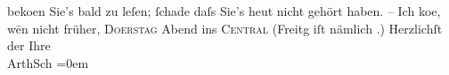 \begin{ledgroupsized}[t]{13cm}
                  beko{\geminationm}en Sie’s bald zu leſen; ſchade daſs Sie’s heut
               nicht gehört haben. – Ich ko{\geminationm}e, wēn nicht früher, \textsc{Do{\geminationn}erstag} Abend ins \textsc{Central} (Freitg iſt nämlich \label{K_L02955-12v}\label{K_L02955-12h}.) \pend
           \pstart
           Herzlichſt {\pb}der Ihre {\\[\baselineskip]}\spacefill\mbox{ArthSch}\pend
           \leftskip=0em{}
         
         \endnumbering{}\end{ledgroupsized}\begin{anhang}\end{anhang}\newcommand{\dateiname}{L02955}\newcommand{\titel}{Arthur Schnitzler an Felix Salten, 21. 3. 1892}\newcommand{\editorInnen}{Martin Anton Müller und Laura Untner}
      